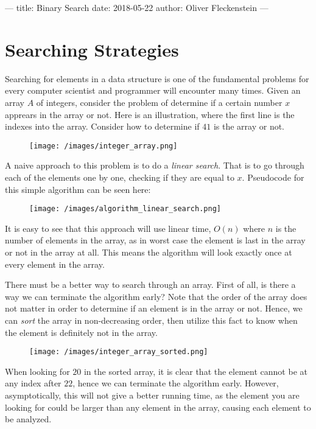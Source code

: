 ---
title: Binary Search
date: 2018-05-22
author: Oliver Fleckenstein
---
\section{Searching Strategies}

    Searching for elements in a data structure is one of the fundamental problems for every computer scientist and programmer will encounter many times.
    Given an array $A$ of integers, consider the problem of determine if a certain number $x$ apprears in the array or not.
    Here is an illustration, where the first line is the indexes into the array.
    Consider how to determine if $41$ is the array or not.

    \begin{figure}[!h]
        \centering
        \texttt{[image: /images/integer\_array.png]}
    \end{figure}

    A naive approach to this problem is to do a \emph{linear search}.
    That is to go through each of the elements one by one, checking if they are equal to $x$.
    Pseudocode for this simple algorithm can be seen here:

    \begin{figure}[!h]
        \centering
        \texttt{[image: /images/algorithm\_linear\_search.png]}
    \end{figure}

    It is easy to see that this approach will use linear time, $O(n)$ where $n$ is the number of elements in the array, as in worst case the element is last in the array or not in the array at all.
    This means the algorithm will look exactly once at every element in the array.

    There must be a better way to search through an array.
    First of all, is there a way we can terminate the algorithm early?
    Note that the order of the array does not matter in order to determine if an element is in the array or not.
    Hence, we can \emph{sort} the array in non-decreasing order, then utilize this fact to know when the element is definitely not in the array.

    \begin{figure}[!h]
        \centering
        \texttt{[image: /images/integer\_array\_sorted.png]}
    \end{figure}

    When looking for $20$ in the sorted array, it is clear that the element cannot be at any index after $22$, hence we can terminate the algorithm early.
    However, asymptotically, this will not give a better running time, as the element you are looking for could be larger than any element in the array, causing each element to be analyzed.

